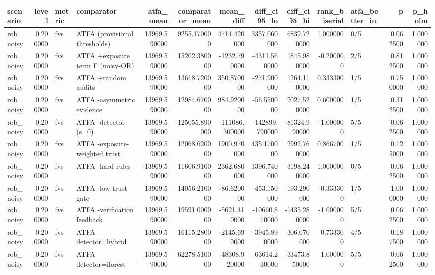 \begin{tabular}{lrllrrrrrrlrr}
\toprule
scenario & level & metric & comparator & atfa\_mean & comparator\_mean & mean\_diff & diff\_ci95\_lo & diff\_ci95\_hi & rank\_biserial & atfa\_better\_in & p & p\_holm \\
\midrule
rob\_noisy & 0.200000 & fvs & ATFA (provisional thresholds) & 13969.590000 & 9255.170000 & 4714.420000 & 3357.060000 & 6839.720000 & 1.000000 & 0/5 & 0.062500 & 1.000000 \\
rob\_noisy & 0.200000 & fvs & ATFA +exposure term F (noisy-OR) & 13969.590000 & 15202.380000 & -1232.790000 & -4311.560000 & 1845.980000 & -0.200000 & 2/5 & 0.812500 & 1.000000 \\
rob\_noisy & 0.200000 & fvs & ATFA +random audits & 13969.590000 & 13618.720000 & 350.870000 & -271.900000 & 1264.110000 & 0.333300 & 1/5 & 0.750000 & 1.000000 \\
rob\_noisy & 0.200000 & fvs & ATFA -asymmetric evidence & 13969.590000 & 12984.670000 & 984.920000 & -56.550000 & 2027.520000 & 0.600000 & 1/5 & 0.312500 & 1.000000 \\
rob\_noisy & 0.200000 & fvs & ATFA -detector (s=0) & 13969.590000 & 125055.890000 & -111086.300000 & -142899.790000 & -81324.990000 & -1.000000 & 5/5 & 0.062500 & 1.000000 \\
rob\_noisy & 0.200000 & fvs & ATFA -exposure-weighted trust & 13969.590000 & 12068.620000 & 1900.970000 & 435.170000 & 2992.760000 & 0.866700 & 1/5 & 0.125000 & 1.000000 \\
rob\_noisy & 0.200000 & fvs & ATFA -hard rules & 13969.590000 & 11606.910000 & 2362.680000 & 1396.740000 & 3198.240000 & 1.000000 & 0/5 & 0.062500 & 1.000000 \\
rob\_noisy & 0.200000 & fvs & ATFA -low-trust gate & 13969.590000 & 14056.210000 & -86.620000 & -453.150000 & 193.290000 & -0.333300 & 1/5 & 1.000000 & 1.000000 \\
rob\_noisy & 0.200000 & fvs & ATFA -verification feedback & 13969.590000 & 19591.000000 & -5621.410000 & -10660.870000 & -1435.280000 & -1.000000 & 5/5 & 0.062500 & 1.000000 \\
rob\_noisy & 0.200000 & fvs & ATFA detector=hybrid & 13969.590000 & 16115.280000 & -2145.690000 & -3945.890000 & 306.070000 & -0.733300 & 4/5 & 0.187500 & 1.000000 \\
rob\_noisy & 0.200000 & fvs & ATFA detector=iforest & 13969.590000 & 62278.510000 & -48308.920000 & -63614.230000 & -33473.850000 & -1.000000 & 5/5 & 0.062500 & 1.000000 \\

\end{tabular}
